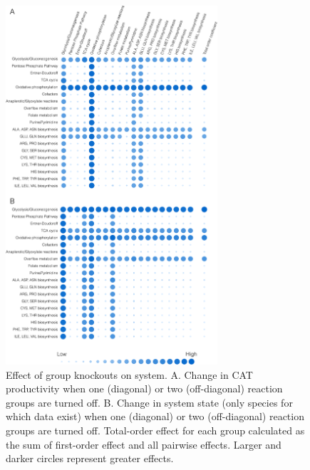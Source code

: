 \documentclass[12pt]{article}
\begin{document}
\begin{figure}[ht]
\centering
\includegraphics[width=0.7\textwidth]{./Figures/Fig_5_GroupKO.pdf}
\caption{Effect of group knockouts on system. A. Change in CAT productivity when one (diagonal) or two (off-diagonal) reaction groups are turned off. B. Change in system state (only species for which data exist) when one (diagonal) or two (off-diagonal) reaction groups are turned off. Total-order effect for each group calculated as the sum of first-order effect and all pairwise effects. Larger and darker circles represent greater effects.}
\label{fig:GroupKO}
\end{figure}

\clearpage
\end{document}
